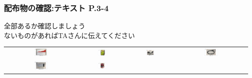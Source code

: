 \documentclass[dvipdfmx]{beamer}
\begin{document}
\begin{frame}[fragile]
	\frametitle{配布物の確認:テキスト P.3-4~~~}
	\begin{center}
	{\large \color{red} 全部あるか確認しましょう\\
		ないものがあればTAさんに伝えてください}
	\end{center}
	\vfill
	\begin{tabular}{cccc}
  \includegraphics[width=0.22\textwidth]{textbook-img009-2023.png}
   &
		\includegraphics[width=0.22\textwidth]{textbook-img010.png} &

  \includegraphics[width=0.22\textwidth]{textbook-img007.png}
   &
  \includegraphics[width=0.22\textwidth]{textbook-img008-2023.png} \\

  \includegraphics[width=0.22\textwidth]{textbook-img005-2023.png}
   &
		\includegraphics[width=0.22\textwidth]{textbook-img006.png} &


\end{tabular}
\end{frame}
\end{document}
